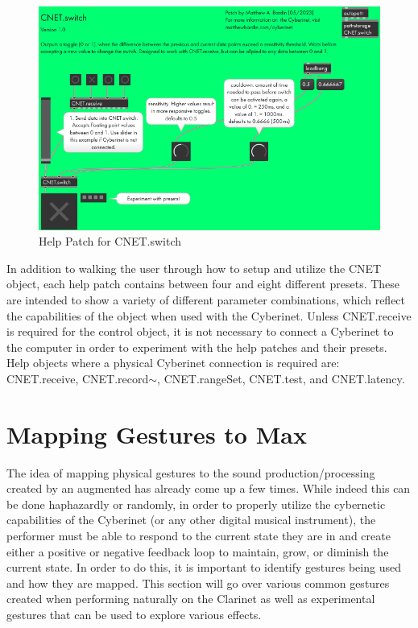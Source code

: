 \begin{figure}
    \centering
    \includegraphics{diagrams/maxPatches/switchHelp.png}
    \caption{Help Patch for CNET.switch}
    \label{fig:switchHelp1}
\end{figure}

In addition to walking the user through how to setup and utilize the CNET object, each help patch contains between four and eight different presets. These are intended to show a variety of different parameter combinations, which reflect the capabilities of the object when used with the Cyberinet. Unless CNET.receive is required for the control object, it is not necessary to connect a Cyberinet to the computer in order to experiment with the help patches and their presets. Help objects where a physical Cyberinet connection is required are: CNET.receive, CNET.record$\sim$, CNET.rangeSet, CNET.test, and CNET.latency.


\section{Mapping Gestures to Max} %

The idea of mapping physical gestures to the sound production/processing created by an augmented has already come up a few times. While indeed this can be done haphazardly or randomly, in order to properly utilize the cybernetic capabilities of the Cyberinet (or any other digital musical instrument), the performer must be able to respond to the current state they are in and create either a positive or negative feedback loop to maintain, grow, or diminish the current state. In order to do this, it is important to identify gestures being used and how they are mapped. This section will go over various common gestures created when performing naturally on the Clarinet as well as experimental gestures that can be used to explore various effects.

